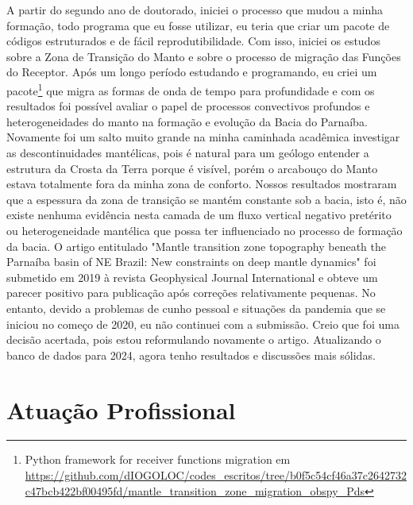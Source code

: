 \documentclass[10pt,a4paper,oneside]{book}
\begin{document}
A partir do segundo ano de doutorado, iniciei o processo que mudou a minha formação, todo programa que eu fosse utilizar, eu teria que criar um pacote de códigos estruturados e de fácil reprodutibilidade. Com isso, iniciei os estudos sobre a Zona de Transição do Manto e sobre o processo de migração das Funções do Receptor. Após um longo período estudando e programando, eu criei um pacote\footnote{Python framework for receiver functions migration em \url{https://github.com/dIOGOLOC/codes_escritos/tree/b0f5c54cf46a37c2642732c47bcb422bf00495fd/mantle_transition_zone_migration_obspy_Pds}} que migra as formas de onda de tempo para profundidade e com os resultados foi possível avaliar o papel de processos convectivos profundos e heterogeneidades do manto na formação e evolução da Bacia do Parnaíba. Novamente foi um salto muito grande na minha caminhada acadêmica investigar as descontinuidades mantélicas, pois é natural para um geólogo entender a estrutura da Crosta da Terra porque é visível, porém o arcabouço do Manto estava totalmente fora da minha zona de conforto. Nossos resultados mostraram que a espessura da zona de transição se mantém constante sob a bacia, isto é, não existe nenhuma evidência nesta camada de um fluxo vertical negativo pretérito ou heterogeneidade mantélica que possa ter influenciado no processo de formação da bacia. O artigo entitulado "Mantle transition zone topography beneath the Parnaíba basin of NE Brazil: New constraints on deep mantle dynamics" foi submetido em 2019 à revista Geophysical Journal International e obteve um parecer positivo para publicação após correções relativamente pequenas. No entanto, devido a problemas de cunho pessoal e situações da pandemia que se iniciou no começo de 2020, eu não continuei com a submissão. Creio que foi uma decisão acertada, pois estou reformulando novamente o artigo. Atualizando o banco de dados para 2024, agora tenho resultados e discussões mais sólidas.

\chapter{Atuação Profissional}
\label{cap_atuacao}
\end{document}
